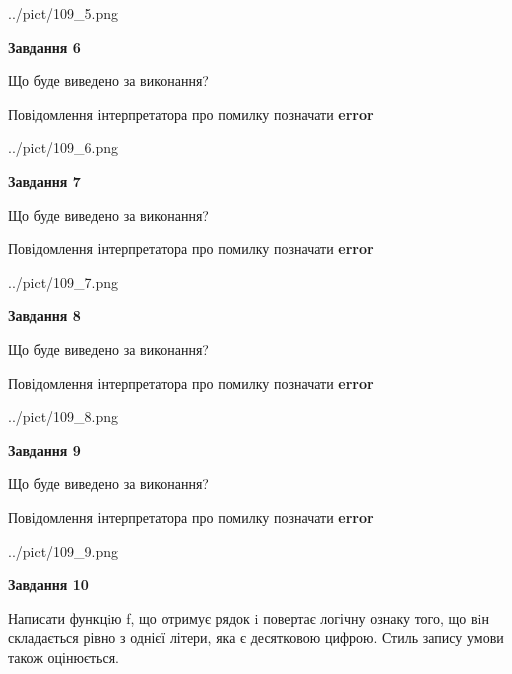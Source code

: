\documentclass[12pt, ukrainian]{article}
\begin{document}
{\begin {large}
\begin{center}
	{../pict/109_5.png}
\end{center}
\newpage

{\begin {center}\textbf{Завдання 6}\end {center}}\par
Що буде виведено за виконання? \par
Повідомлення інтерпретатора про помилку позначати \textbf{error}

\begin{center}
	{../pict/109_6.png}
\end{center}
\newpage

{\begin {center}\textbf{Завдання 7}\end {center}}\par
Що буде виведено за виконання? \par
Повідомлення інтерпретатора про помилку позначати \textbf{error}

\begin{center}
	{../pict/109_7.png}
\end{center}
\newpage

{\begin {center}\textbf{Завдання 8}\end {center}}\par
Що буде виведено за виконання? \par
Повідомлення інтерпретатора про помилку позначати \textbf{error}

\begin{center}
	{../pict/109_8.png}
\end{center}
\newpage

{\begin {center}\textbf{Завдання 9}\end {center}}\par
Що буде виведено за виконання? \par
Повідомлення інтерпретатора про помилку позначати \textbf{error}

\begin{center}
	{../pict/109_9.png}
\end{center}
\newpage

{\begin {center}\textbf{Завдання 10}\end {center}}\par

Написати функцiю f, що отримує рядок i повертає логічну ознаку того, що вiн складається рівно з однієї літери, яка є десятковою цифрою. Стиль запису умови також оцінюється.\par
\newpage

\end {large}}
\end{document}
